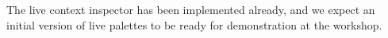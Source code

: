 The live context inspector has been implemented already, and we expect an initial version of live palettes to be ready for demonstration at the workshop.

